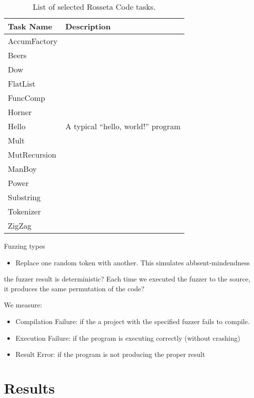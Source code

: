 \documentclass[10pt]{sigplanconf}
\begin{document}
\begin{table}
\begin{center}
\caption{List of selected Rosseta Code tasks.}
\label{tab:Tasks}
\begin{tabular}{ l p{4cm}}
 \hline
Task Name & Description\\
\hline
AccumFactory \\
Beers \\
Dow \\
FlatList \\
FuncComp \\
Horner \\
Hello & A typical ``hello, world!'' program\\
Mult \\
MutRecursion \\
ManBoy \\
Power \\
Substring \\
Tokenizer \\
ZigZag \\
\hline
\end{tabular}
\end{center}
\end{table}

Fuzzing types
\begin{itemize}
\item Replace one random token with another.
This simulates abbsent-mindendness 
\end{itemize}

the fuzzer result is deterministic? Each time we executed the fuzzer to the source, it produces the same permutation of the code?

We measure:

\begin{itemize}
	\item Compilation Failure: if the a project with the specified fuzzer fails to compile.
	\item Execution Failure: if the program is executing correctly (without crashing)
	\item Result Error: if the program is not producing the proper result
\end{itemize}

\section{Results} %
\end{document}
